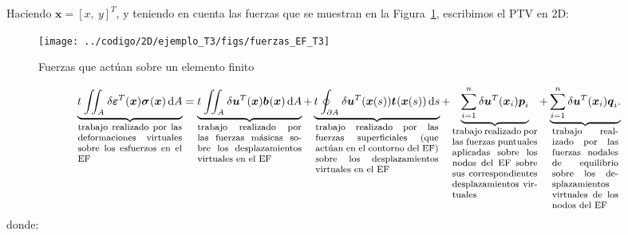 \documentclass[12pt,letterpaper, landscape]{article}
\newcommand{\e}{{}}
\newcommand{\ve}[1]{{\boldsymbol{#1}}}
\newcommand{\dd}{\operatorname{d} \!}
\begin{document}
Haciendo $\ve{x} = [x,\ y]^T$, y teniendo en cuenta las fuerzas que se muestran en la Figura~\ref{eq:fuerzas_sobre_EF}, escribimos el PTV en 2D:
\begin{figure}[p]
   \centering   
   \texttt{[image: ../codigo/2D/ejemplo\_T3/figs/fuerzas\_EF\_T3]}
   \caption{Fuerzas que actúan sobre un elemento finito}
   \label{eq:fuerzas_sobre_EF}
\end{figure}
\begin{equation}
\underbrace{t^\e \iint_{A^\e} \delta\ve{\varepsilon}_\e^T(\ve{x}) \ve{\sigma}^\e(\ve{x}) \dd A}_{\footnotesize\parbox{11em}{trabajo realizado por las deformaciones virtuales sobre los esfuerzos en el EF}}
 = \underbrace{t^\e \iint_{A^\e} \delta \ve{u}_\e^T(\ve{x}) \ve{b}^\e(\ve{x}) \dd A}_{\footnotesize\parbox{11em}{trabajo realizado por las fuerzas másicas sobre los desplazamientos virtuales en el EF}}
+ \underbrace{t^\e \oint_{\partial A^\e} \delta \ve{u}_\e^T(\ve{x}(s)) \ve{t}^\e(\ve{x}(s)) \dd s}_{\footnotesize\parbox{13em}{trabajo realizado por las fuerzas superficiales (que actúan en el contorno del EF) sobre los desplazamientos virtuales en el EF}}
+ \underbrace{\sum_{i=1}^n \delta \ve{u}_\e^T(\ve{x}_i) \ve{p}_i^\e}_{\footnotesize\parbox{9em}{trabajo realizado por las fuerzas puntuales aplicadas sobre los nodos del EF sobre sus correspondientes desplazamientos virtuales}}
+ \underbrace{\sum_{i=1}^n \delta \ve{u}_\e^T(\ve{x}_i) \ve{q}_i^\e.}_{\footnotesize\parbox{7em}{trabajo realizado por las fuerzas nodales de equilibrio sobre los desplazamientos virtuales de los nodos del EF}} \label{eq:PTV}
\end{equation}
donde: 
\end{document}
